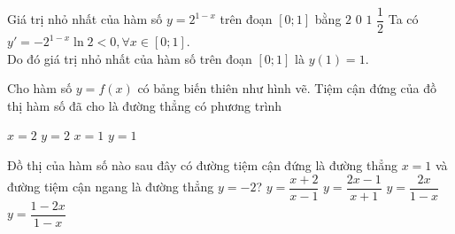 \begin{ex}%
	Giá trị nhỏ nhất của hàm số $y = 2^{1-x}$ trên đoạn $\left[0; 1\right]$ bằng
	\choice
	{$2$}
	{$0$}
	{\True $1$}
	{$\dfrac{1}{2}$}
	\loigiai
	{
	Ta có $y' = -2^{1-x}\ln{2} < 0, \forall x \in \left[0; 1\right]$.\\
	Do đó giá trị nhỏ nhất của hàm số trên đoạn $\left[0; 1 \right]$ là $y\left(1 \right) = 1$.
	}
\end{ex}

\begin{ex}%
	Cho hàm số $y=f(x)$ có bảng biến thiên như hình vẽ. Tiệm cận đứng của đồ thị hàm số đã cho là đường thẳng có phương trình
	\begin{center}
	\end{center}
	\choice
	{$x=2$}
	{$y=2$}
	{\True$x=1$}
	{$y=1$}
\end{ex}

\begin{ex}%
	Đồ thị của hàm số nào sau đây có đường tiệm cận đứng là đường thẳng $x=1$ và đường tiệm cận ngang là đường thẳng $y=-2$?
	\choice
	{$y=\dfrac{x+2}{x-1}$}
	{$y=\dfrac{2x-1}{x+1}$}
	{\True $y=\dfrac{2x}{1-x}$}
	{$y=\dfrac{1-2x}{1-x}$}
\end{ex}

